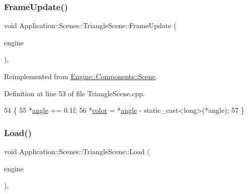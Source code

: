 \subsubsection{\texorpdfstring{Frame\+Update()}{FrameUpdate()}}
{\footnotesize\ttfamily void Application\+::\+Scenes\+::\+Triangle\+Scene\+::\+Frame\+Update (\begin{DoxyParamCaption}\item[{\mbox{\hyperlink{classEngine_1_1BaseEngine}{Engine\+::\+Base\+Engine}} $\ast$}]{engine }\end{DoxyParamCaption})\hspace{0.3cm}{\ttfamily [override]}, {\ttfamily [virtual]}}



Reimplemented from \mbox{\hyperlink{classEngine_1_1Components_1_1Scene_abd8fcdcac52dbce6a0a18de3860ab087}{Engine\+::\+Components\+::\+Scene}}.



Definition at line 53 of file Triangle\+Scene.\+cpp.


\begin{DoxyCode}
54 \{
55     *\mbox{\hyperlink{classApplication_1_1Scenes_1_1TriangleScene_a398daba41c0317ccb019d714bec0c795}{angle}} += 0.1f;
56     *\mbox{\hyperlink{classApplication_1_1Scenes_1_1TriangleScene_ab5d8bb91e423f50a7c54979853cfcbc9}{color}} = *\mbox{\hyperlink{classApplication_1_1Scenes_1_1TriangleScene_a398daba41c0317ccb019d714bec0c795}{angle}} - \textcolor{keyword}{static\_cast<}\textcolor{keywordtype}{long}\textcolor{keyword}{>}(*angle);
57 \}
\end{DoxyCode}
\mbox{\label{classApplication_1_1Scenes_1_1TriangleScene_a4bfd44cab6aa0eafe47f379dafe3843e}} 
\subsubsection{\texorpdfstring{Load()}{Load()}}
{\footnotesize\ttfamily void Application\+::\+Scenes\+::\+Triangle\+Scene\+::\+Load (\begin{DoxyParamCaption}\item[{\mbox{\hyperlink{classEngine_1_1BaseEngine}{Engine\+::\+Base\+Engine}} $\ast$}]{engine }\end{DoxyParamCaption})\hspace{0.3cm}{\ttfamily [override]}, {\ttfamily [virtual]}}



